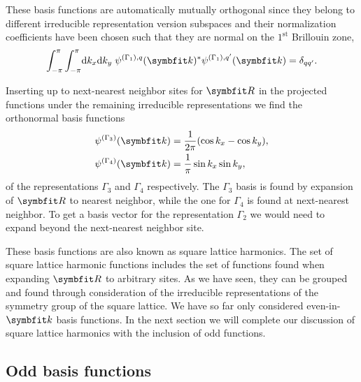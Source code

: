 These basis functions are automatically
mutually orthogonal since they belong to different irreducible representation version subspaces and their normalization coefficients have been chosen such that they are normal
on the $1^\text{st}$ Brillouin zone, \ie
\begin{equation}
    \label{eq:Group:SLH:even:G1orthonormal}
    \int_{-\pi}^\pi\int_{-\pi}^\pi\!\textrm{d}k_x\textrm{d}k_y\;\psi^{(\Gamma_1),q}(\v{k})^\ast\psi^{(\Gamma_1),q'}(\v{k}) = \delta_{qq'}.
\end{equation}

Inserting up to next-nearest neighbor sites for $\v{R}$ in the projected functions under the remaining irreducible representations we find the orthonormal basis 
functions
\begin{subequations}
    \label{eq:Group:SLH:even:bases}
    \begin{align}
        \label{eq:Group:SLH:even:bases:G3}
        \psi^{(\Gamma_3)}(\v{k}) &= \frac{1}{2\pi}(\cos k_x - \cos k_y),\\
        \label{eq:Group:SLH:even:bases:G4}
        \psi^{(\Gamma_4)}(\v{k}) &= \frac{1}{\pi}\sin k_x\sin k_y,
    \end{align}
\end{subequations}
of the representations $\Gamma_3$ and $\Gamma_4$ respectively. The $\Gamma_3$ basis is found by expansion of $\v{R}$ to nearest neighbor, while the one for $\Gamma_4$
is found at next-nearest neighbor. To get a basis vector for the representation $\Gamma_2$ we would need to expand beyond the next-nearest neighbor site.

These basis functions are also known as square lattice harmonics. The set of square lattice harmonic functions includes the set of functions found when expanding
$\v{R}$ to arbitrary sites. As we have seen, they can be grouped and found through consideration of the irreducible representations of the symmetry group of the
square lattice. We have so far only considered even-in-$\v{k}$ basis functions. In the next section we will complete our discussion of square lattice harmonics
with the inclusion of odd functions.


\subsection{Odd basis functions}


